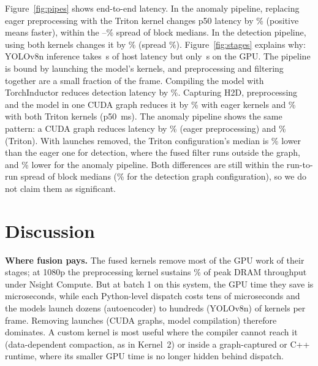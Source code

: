 \documentclass[10pt,twocolumn,letterpaper]{article}
\begin{document}
Figure~\ref{fig:pipes} shows end-to-end latency. In the anomaly pipeline, replacing eager
preprocessing with the Triton kernel changes p50 latency by
\% (positive means faster), within the
--\%
spread of block medians. In the detection pipeline, using both kernels changes it by
\% (spread
\%). Figure~\ref{fig:stages} explains
why: YOLOv8n inference takes \,\textmu s
of host latency but only \,\textmu s
on the GPU. The pipeline is bound by launching the model's kernels, and preprocessing and filtering
together are a small fraction of the frame. Compiling the model with TorchInductor reduces detection
latency by \%. Capturing H2D,
preprocessing and the model in one CUDA graph reduces it by
\% with eager kernels and
\% with both Triton kernels
(p50 \,ms). The anomaly
pipeline shows the same pattern: a CUDA graph reduces latency by
\% (eager preprocessing) and
\% (Triton). With launches removed, the
Triton configuration's median is \% lower than the eager one
for detection, where the fused filter runs outside the graph, and \%
lower for the anomaly pipeline. Both differences are still within the run-to-run spread of block medians
(\% for the detection graph
configuration), so we do not claim them as significant.

\section{Discussion}
\label{sec:discussion}
\noindent\textbf{Where fusion pays.} The fused kernels remove most of the GPU work of their stages; at
1080p the preprocessing kernel sustains \% of peak DRAM
throughput under Nsight Compute. But at batch 1 on this system, the GPU
time they save is microseconds, while each Python-level dispatch costs tens of microseconds and the
models launch dozens (autoencoder) to hundreds (YOLOv8n) of kernels per frame. Removing launches (CUDA graphs, model compilation) therefore
dominates. A custom kernel is most useful where the compiler cannot reach it (data-dependent
compaction, as in Kernel~2) or inside a graph-captured or C++ runtime, where its smaller GPU time is
no longer hidden behind dispatch.
\end{document}
